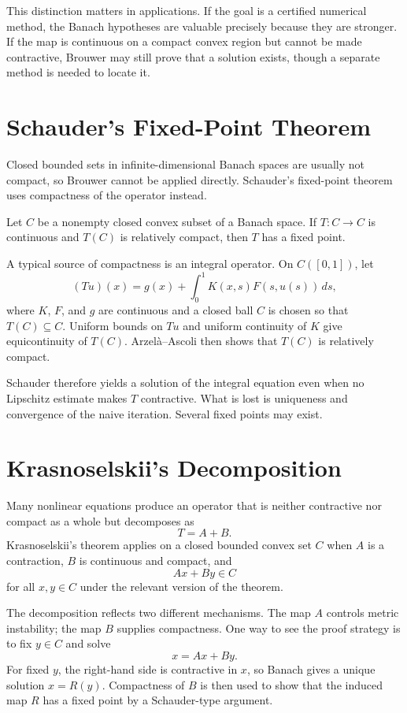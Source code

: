 This distinction matters in applications.  If the goal is a certified numerical method, the Banach hypotheses are valuable precisely because they are stronger.  If the map is continuous on a compact convex region but cannot be made contractive, Brouwer may still prove that a solution exists, though a separate method is needed to locate it.

\section{Schauder's Fixed-Point Theorem}

Closed bounded sets in infinite-dimensional Banach spaces are usually not compact, so Brouwer cannot be applied directly.  Schauder's fixed-point theorem uses compactness of the operator instead.

\begin{theorem}
Let \(C\) be a nonempty closed convex subset of a Banach space.  If \(T:C\to C\) is continuous and \(T(C)\) is relatively compact, then \(T\) has a fixed point.
\end{theorem}

A typical source of compactness is an integral operator.  On \(C([0,1])\), let
\[
  (Tu)(x)=g(x)+\int_0^1K(x,s)F(s,u(s))\,ds,
\]
where \(K\), \(F\), and \(g\) are continuous and a closed ball \(C\) is chosen so that \(T(C)\subseteq C\).  Uniform bounds on \(Tu\) and uniform continuity of \(K\) give equicontinuity of \(T(C)\).  Arzelà--Ascoli then shows that \(T(C)\) is relatively compact.

Schauder therefore yields a solution of the integral equation even when no Lipschitz estimate makes \(T\) contractive.  What is lost is uniqueness and convergence of the naive iteration.  Several fixed points may exist.

\section{Krasnoselskii's Decomposition}

Many nonlinear equations produce an operator that is neither contractive nor compact as a whole but decomposes as
\[
  T=A+B.
\]
Krasnoselskii's theorem applies on a closed bounded convex set \(C\) when \(A\) is a contraction, \(B\) is continuous and compact, and
\[
  Ax+By\in C
\]
for all \(x,y\in C\) under the relevant version of the theorem.

The decomposition reflects two different mechanisms.  The map \(A\) controls metric instability; the map \(B\) supplies compactness.  One way to see the proof strategy is to fix \(y\in C\) and solve
\[
  x=Ax+By.
\]
For fixed \(y\), the right-hand side is contractive in \(x\), so Banach gives a unique solution \(x=R(y)\).  Compactness of \(B\) is then used to show that the induced map \(R\) has a fixed point by a Schauder-type argument.

